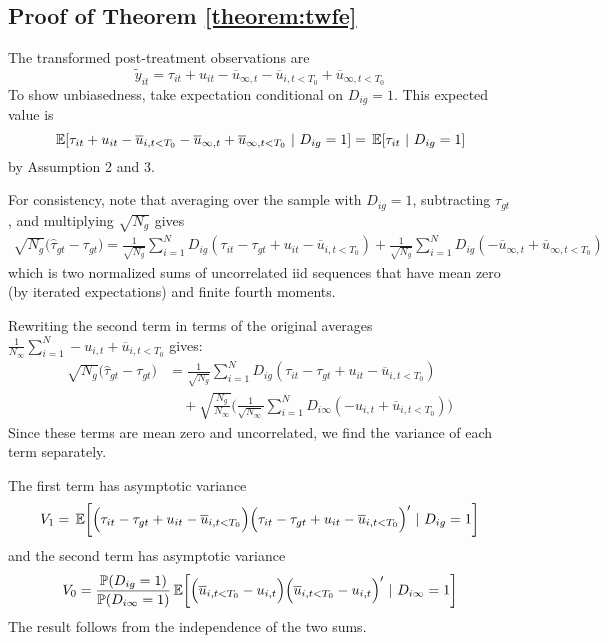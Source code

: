 \subsection{Proof of Theorem \autoref{theorem:twfe}}

The transformed post-treatment observations are
\begin{equation}
    \tilde{y}_{it} = \tau_{it} + u_{it} - \overline{u}_{\infty,t}  - \overline{u}_{i,t < T_0} + \overline{u}_{\infty,t < T_0}
\end{equation}
To show unbiasedness, take expectation conditional on $D_{ig} = 1$. This expected value is
\begin{equation}
    \expec{ \tau_{it} + u_{it} - \overline{u}_{i,t < T_0} - \overline{u}_{\infty,t} + \overline{u}_{\infty,t < T_0} }{D_{ig} = 1} = \expec{\tau_{it}}{D_{ig} = 1}
\end{equation}
by Assumption 2 and 3.

For consistency, note that averaging over the sample with $D_{ig} = 1$, subtracting $\tau_{gt}$, and multiplying $\sqrt{N_{g}}$ gives
\begin{align}
    \sqrt{N_{g}} \big( \widehat{\tau}_{gt} - \tau_{gt} \big) 
    = \frac{1}{\sqrt{N_{g}}}\sum_{i=1}^N D_{ig} (\tau_{it} - \tau_{gt} + u_{it} - \overline{u}_{i,t < T_0})
    + \frac{1}{\sqrt{N_{g}}}\sum_{i = 1}^N D_{ig} (- \overline{u}_{\infty,t} + \overline{u}_{\infty,t < T_0}) 
\end{align}
which is two normalized sums of uncorrelated iid sequences that have mean zero (by iterated expectations) and finite fourth moments. %

Rewriting the second term in terms of the original averages $\frac{1}{N_\infty} \sum_{i=1}^N - u_{i,t} + \overline{u}_{i,t < T_0}$ gives:
\begin{align*}
    \sqrt{N_{g}} \big( \widehat{\tau}_{gt} - \tau_{gt} \big) 
    &= \frac{1}{\sqrt{N_{g}}}\sum_{i=1}^N D_{ig} (\tau_{it} - \tau_{gt} + u_{it} - \overline{u}_{i,t < T_0}) \\
    &\quad + \sqrt{\frac{N_g}{N_\infty}} \bigg ( \frac{1}{\sqrt{N_\infty}} \sum_{i = 1}^N D_{i\infty} (- u_{i,t} + \overline{u}_{i,t < T_0} ) \bigg)
\end{align*}
Since these terms are mean zero and uncorrelated, we find the variance of each term separately. 

The first term has asymptotic variance 
\begin{equation}
V_1 = \expec{\Big( \tau_{it} - \tau_{gt} + u_{it} - \overline{u}_{i,t < T_0} \Big) \Big( \tau_{it} - \tau_{gt} + u_{it} - \overline{u}_{i,t < T_0} \Big)'}{D_{ig} = 1}
\end{equation}
and the second term has asymptotic variance
\begin{equation}
V_0 = \frac{\mathbb{P}(D_{ig} = 1)}{\mathbb{P}(D_{i\infty} = 1)} \expec{ \Big( \overline{u}_{i,t < T_0} - u_{i,t} \Big) \Big( \overline{u}_{i,t < T_0} - u_{i,t} \Big)' }{D_{i\infty} = 1}
\end{equation}
The result follows from the independence of the two sums.




